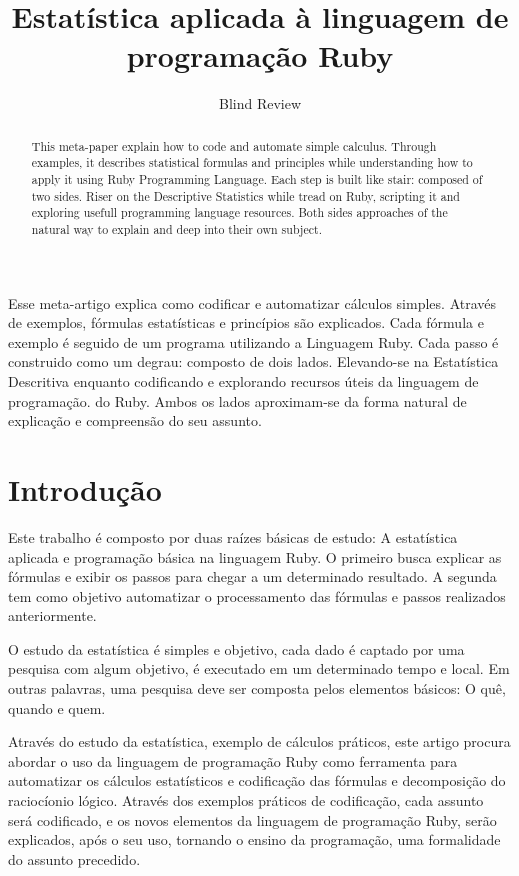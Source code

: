 \documentclass[12pt]{article}
\title{Estatística aplicada à linguagem de programação Ruby}
\author{Blind Review}
\begin{document}
\maketitle

\begin{abstract}
  This meta-paper explain how to code and automate simple calculus. 
  Through examples, it describes statistical formulas and principles 
  while understanding how to apply it using Ruby Programming Language.
  Each step is built like stair: composed of two sides. Riser on the
  Descriptive Statistics while tread on Ruby, scripting it and exploring
  usefull programming language resources.
  Both sides approaches of the natural way to explain and deep into their own subject.
\end{abstract}
     
\begin{resumo} 
  Esse meta-artigo explica como codificar e automatizar cálculos simples. 
  Através de exemplos, fórmulas estatísticas e princípios são explicados.
  Cada fórmula e exemplo é seguido de um programa utilizando a Linguagem Ruby.
  Cada passo é construido como um degrau: composto de dois lados. Elevando-se na 
  Estatística Descritiva enquanto codificando e explorando recursos úteis da linguagem de programação.
  do Ruby. Ambos os lados aproximam-se da forma natural de explicação e 
 compreensão do seu assunto.
  
\end{resumo}

\section{Introdução}

Este trabalho é composto por duas raízes básicas de estudo: A estatística 
aplicada e programação básica na linguagem Ruby. O primeiro busca explicar
as fórmulas e exibir os passos para chegar a um determinado resultado. 
A segunda tem como objetivo automatizar o processamento das fórmulas e 
passos realizados anteriormente.

O estudo da estatística é simples e objetivo, cada dado é captado por uma pesquisa com algum objetivo, é executado em um determinado tempo e local. Em outras palavras, uma pesquisa deve ser composta pelos elementos básicos: O quê, quando e quem.

Através do estudo da estatística, exemplo de cálculos práticos, este artigo procura abordar o uso da linguagem de programação Ruby como ferramenta para automatizar os cálculos estatísticos e codificação das fórmulas e decomposição do raciocíonio lógico. Através dos exemplos práticos de codificação, cada assunto será codificado, e os novos elementos da linguagem de programação Ruby, serão explicados, após o seu uso, tornando o ensino da programação, uma formalidade do assunto precedido.
\end{document}
